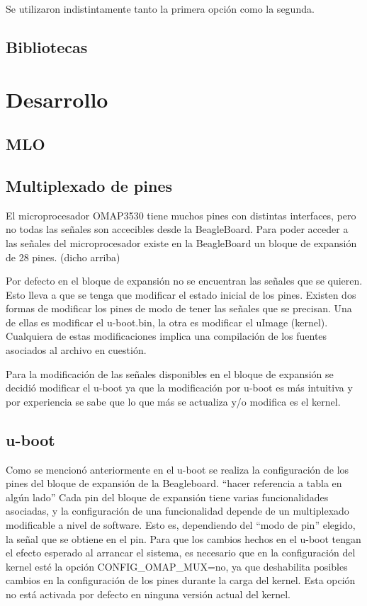 \bigskip
Se utilizaron indistintamente tanto la primera opción como la segunda.

\subsection{Bibliotecas}

\section{Desarrollo}
\subsection{MLO}
\subsection{Multiplexado de pines}
El microprocesador OMAP3530 tiene muchos pines con distintas interfaces, pero no todas las 
señales son accecibles desde la BeagleBoard. Para poder acceder a las señales del microprocesador 
existe en la BeagleBoard un bloque de expansión de 28 pines. (dicho arriba)

\bigskip
Por defecto en el bloque de expansión no se encuentran las señales que se quieren. Esto 
lleva a que se tenga que modificar el estado inicial de los pines. 
Existen dos formas de modificar los pines de modo de tener las señales que se precisan. Una 
de ellas es modificar el u-boot.bin, la otra es modificar el uImage (kernel). Cualquiera de estas modificaciones implica una compilación de los fuentes asociados al archivo en cuestión. 

\bigskip
Para la modificación de las señales disponibles en el bloque de expansión se decidió modificar el u-boot ya que la modificación por u-boot es más intuitiva y por experiencia se sabe que lo que más se actualiza y/o modifica es el kernel. 

\subsection{u-boot}
Como se mencionó anteriormente en el u-boot se realiza la configuración de los pines del bloque de expansión de la Beagleboard. “hacer referencia a tabla en algún lado”
Cada pin del bloque de expansión tiene varias funcionalidades asociadas, y la configuración de una 
funcionalidad depende de un multiplexado modificable a nivel de software. Esto es, dependiendo del “modo de pin” elegido, la señal que se obtiene en el pin.
Para que los cambios hechos en el u-boot tengan el efecto esperado al arrancar el sistema, es necesario que en la configuración del kernel esté la opción CONFIG\_OMAP\_MUX=no, ya que deshabilita posibles cambios en la configuración de los pines durante la carga del kernel. Esta opción no está activada por defecto en ninguna versión actual del kernel. 

